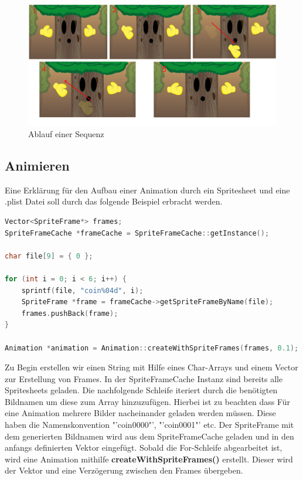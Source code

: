 \begin{figure}[H]
  \centering
  \includegraphics[width=15.5cm]{resources/dokubaum}
  \caption{Ablauf einer Sequenz}
  \label{fig:dokubaum} 
\end{figure}

\subsection{Animieren}
Eine Erklärung für den Aufbau einer Animation durch ein Spritesheet und eine .plist Datei soll durch das folgende Beispiel erbracht werden.

\begin{lstlisting}[label=lst:build_josie_animation,
				   language=C++,
				   firstnumber=53,
				   caption=Animation erstellen ( CollisionLayer.cpp )]
Vector<SpriteFrame*> frames;
SpriteFrameCache *frameCache = SpriteFrameCache::getInstance();

char file[9] = { 0 };

for (int i = 0; i < 6; i++) {
	sprintf(file, "coin%04d", i);
	SpriteFrame *frame = frameCache->getSpriteFrameByName(file);
	frames.pushBack(frame);
}

Animation *animation = Animation::createWithSpriteFrames(frames, 0.1);
\end{lstlisting}

Zu Begin erstellen wir einen String mit Hilfe eines Char-Arrays und einem Vector zur Erstellung von Frames. In der SpriteFrameCache Instanz sind bereits alle Spritesheets geladen. Die nachfolgende Schleife iteriert durch die benötigten Bildnamen um diese zum Array hinzuzufügen. Hierbei ist zu beachten dass Für eine Animation mehrere Bilder nacheinander geladen werden müssen. Diese haben die Namenskonvention "'coin0000"', "'coin0001"' etc. Der SpriteFrame mit dem generierten Bildnamen wird aus dem SpriteFrameCache geladen und in den anfangs definierten Vektor eingefügt. 
Sobald die For-Schleife abgearbeitet ist, wird eine Animation mithilfe \textbf{createWithSpriteFrames()} erstellt. Dieser wird der Vektor und eine Verzögerung zwischen den Frames übergeben.

